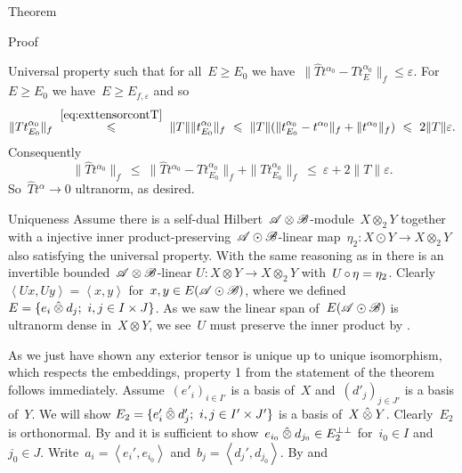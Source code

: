 \documentclass[b]{subfiles}
\begin{document}
\begin{parsec}
\begin{point}{Theorem}
\begin{point}{Proof}
\begin{point}{Universal property}
such that for all~$E \geq E_0$
we have~$\| \hat{T} t^{\alpha_0} -T t^{\alpha_0}_E \|_f \leq \varepsilon$.
For~$E \geq E_0$ we have~$E \geq E_{f,\varepsilon}$ and so
\begin{equation*}
 \|T t^{\alpha_0}_{E_0}\|_f
 \  \overset{\eqref{eq:exttensorcontT}}{\leq}\  \|T\| \|t^{\alpha_0}_{E_0}\|_f
  \  \leq\ \|T\|
  ( \|t^{\alpha_0}_{E_0} - t^{\alpha_0}\|_f +
  \| t^{\alpha_0} \|_f)
   \ \leq\  2 \|T\| \varepsilon.
\end{equation*}
    Consequently
\begin{equation*}
    \|\hat{T} t^{\alpha_0} \|_f \ \leq  \ 
    \|\hat{T} t^{\alpha_0} - T t^{\alpha_0}_{E_0} \|_f
                + \|T t^{\alpha_0}_{E_0}\|_f
    \ \leq\  \varepsilon + 2\|T\|\varepsilon.
\end{equation*}
So~$\hat{T}t^\alpha \to 0$ ultranorm, as desired.
\end{point}
\begin{point}{Uniqueness}%
Assume there is a self-dual Hilbert~$\scrA\otimes\scrB$-module~$X \otimes_2 Y$
    together with a injective
    inner product-preserving~$\scrA\odot\scrB$-linear
    map~$\eta_2 \colon X \odot Y \to X \otimes_2 Y$
    also satisfying the universal property.
With the same reasoning as in 
    there is an invertible bounded~$\scrA\otimes\scrB$-linear
    $U\colon X \otimes Y \to X \otimes_2 Y$
    with~$U \after \eta = \eta_2$.
Clearly~$\left<Ux, U y\right> = \left<x,y\right>$
    for~$x,y \in E (\scrA\odot\scrB)$,
    where we defined~$E = \{e_i \hotimes d_j; \ i,j \in I\times J\}$.
As we saw the linear span of~$E (\scrA\odot\scrB)$
    is ultranorm dense in~$X \otimes Y$,
    we see~$U$ must preserve the inner product by .
\end{point}
\begin{point}%
As we just have shown any exterior tensor is unique up to unique isomorphism,
    which respects the embeddings, property 1 from the statement
    of the theorem follows immediately.
Assume~$(e'_i)_{i \in I'}$ is a basis of~$X$
    and~$(d'_j)_{j \in J'}$ is a basis of~$Y$.
We will show $E_2 =\{ e'_i \hotimes d'_j; \ i,j \in I'\times J'\}$
is a basis of~$X \hotimes Y$.
Clearly~$E_2$ is orthonormal.
By  and 
    it is sufficient to show~$e_{i_0} \hotimes d_{j_0} \in E_2^{\perp\perp}$
    for~$i_0 \in I$ and $j_0 \in J$.
Write~$a_i = \left<e_i',e_{i_0}\right>$
    and~$b_j = \left<d_j',d_{j_0}\right>$.
By  and 

\end{point}
\end{point}
\end{point}
\end{parsec}
\end{document}
